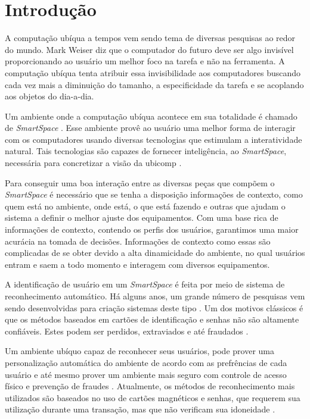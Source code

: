 
\chapter{Introdução}
	
A computação ubíqua a tempos vem sendo tema de diversas pesquisas ao redor do mundo. Mark Weiser diz que o computador do futuro deve ser algo invisível \cite{weiser1, weiser2} proporcionando ao usuário um melhor foco na tarefa e não na ferramenta. A computação ubíqua tenta atribuir essa invisibilidade aos computadores buscando cada vez mais a diminuição do tamanho, a especificidade da tarefa e se acoplando aos objetos do dia-a-dia.

Um ambiente onde a computação ubíqua acontece em sua totalidade é chamado de \textit{SmartSpace} \cite{gregoryabowd}. Esse ambiente provê ao usuário uma melhor forma de interagir com os computadores usando diversas tecnologias que estimulam a interatividade natural. Tais tecnologias são capazes de fornecer inteligência, ao \textit{SmartSpace}, necessária para concretizar a visão da ubicomp \cite{fabriciobuzzeto}.

Para conseguir uma boa interação entre as diversas peças que compõem o \textit{SmartSpace} é necessário que se tenha a disposição informações de contexto,  como quem está no ambiente, onde está, o que está fazendo e outras que ajudam o sistema a definir o melhor ajuste dos equipamentos. Com uma base rica de informações de contexto, contendo os perfis dos usuários, garantimos uma maior acurácia na tomada de decisões. Informações de contexto como essas são complicadas de se obter devido a alta dinamicidade do ambiente, no qual usuários entram e saem a todo momento e interagem com diversos equipamentos.

A identificação de usuário em um \textit{SmartSpace} é feita por meio de sistema de reconhecimento automático. Há alguns anos, um grande número de pesquisas vem sendo desenvolvidas para criação sistemas deste tipo \cite{saocarlos}. Um dos motivos clássicos é que os métodos baseados em cartões de identificação e senhas não são altamente confiáveis. Estes podem ser perdidos, extraviados e até fraudados \cite{bolle}.

Um ambiente ubíquo capaz de reconhecer seus usuários, pode prover uma personalização automática do ambiente de acordo com as prefrências de cada usuário e até mesmo prover um ambiente mais seguro com controle de acesso físico e prevenção de fraudes \cite{saocarlos}. Atualmente, os métodos de reconhecimento mais utilizados são baseados no uso de cartões magnéticos e senhas, que requerem sua utilização durante uma transação, mas que não verificam sua idoneidade \cite{daugman}.

